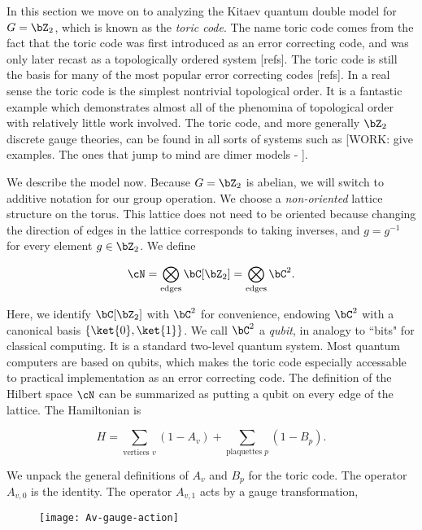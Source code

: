 In this section we move on to analyzing the Kitaev quantum double model for $G=\bZ_2$, which is known as the \textit{toric code}. The name toric code comes from the fact that the toric code was first introduced as an error correcting code, and was only later recast as a topologically ordered system [refs]. The toric code is still the basis for many of the most popular error correcting codes [refs]. In a real sense the toric code is the simplest nontrivial topological order. It is a fantastic example which demonstrates almost all of the phenomina of topological order with relatively little work involved. The toric code, and more generally $\bZ_2$ discrete gauge theories, can be found in all sorts of systems such as [WORK: give examples. The ones that jump to mind are dimer models - \cite{moessner2001resonating, misguich2002quantum}]. 

We describe the model now. Because $G=\bZ_2$ is abelian, we will switch to additive notation for our group operation. We choose a \textit{non-oriented} lattice structure on the torus. This lattice does not need to be oriented because changing the direction of edges in the lattice corresponds to taking inverses, and $g=g^{-1}$ for every element $g\in \bZ_2$. We define

$$\cN = \bigotimes_{\text{edges}}\bC[\bZ_2]=\bigotimes_{\text{edges}}\bC^2.$$

Here, we identify $\bC[\bZ_2]$ with $\bC^2$ for convenience, endowing $\bC^2$ with a canonical basis $\{\ket{0},\ket{1}\}$. We call $\bC^2$ a \textit{qubit}, in analogy to ``bits" for classical computing. It is a standard two-level quantum system. Most quantum computers are based on qubits, which makes the toric code especially accessable to practical implementation as an error correcting code. The definition of the Hilbert space $\cN$ can be summarized as putting a qubit on every edge of the lattice. The Hamiltonian is

$$H=\sum_{\text{vertices }v}(1-A_v)+\sum_{\text{plaquettes }p}(1-B_p).$$

We unpack the general definitions of $A_v$ and $B_p$ for the toric code. The operator $A_{v,0}$ is the identity. The operator $A_{v,1}$ acts by a gauge transformation,

\begin{figure}[h]
\begin{center}
\texttt{[image: Av-gauge-action]}
\end{center}
\end{figure}


